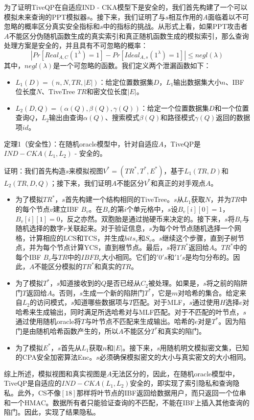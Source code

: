 \documentclass{cumcmthesis}
\numberwithin{equation}{section} %
\numberwithin{figure}{section} %
\numberwithin{table}{section} %
\begin{document}
为了证明TiveQP在自适应IND - CKA模型下是安全的，我们首先构建了一个可以模拟未来查询的PPT模拟器\(s\)。接下来，我们证明了与\(s\)相互作用的\(A\)面临着以不可忽略的概率区分真实安全指标和\(s\)中的指标的挑战。从形式上看，如果PPT攻击者\(A\)不能区分伪随机函数生成的真实索引和真正随机函数生成的模拟索引，那么查询处理方案是安全的，并且具有不可忽略的概率：
\[|Pr[Real_{A, C}(1^{\lambda}) = 1] - Pr[Ideal_{A, s}(1^{\lambda}) = 1]| \leq negl(\lambda)\]
其中，\(negl(\lambda)\)是一个可忽略的函数。我们定义两个泄漏函数如下：
\begin{itemize}
    \item \(L_{1}(D) = (n, N, TR,|E|)\)：给定位置数据集\(D\)，\(L_{1}\)输出数据集大小\(n\)、IBF位长度\(N\)、TiveTree \(TR\)和密文位长度\(|E|\)。
    \item \(L_{2}(D, Q) = (\alpha(Q), \beta(Q), \gamma(Q))\)：给定一个位置数据集\(D\)和一个位置查询\(Q\)，\(L_{2}\)输出由查询\(\alpha(Q)\)、搜索模式\(\beta(Q)\)和路径模式\(\gamma(Q)\)返回的数据项\(id\)。
\end{itemize}

定理1（安全性）：在随机oracle模型中，针对自适应\(A\)，TiveQP是\(IND - CKA(L_{1}, L_{2})\) - 安全的。

证明：我们首先构造\(s\)来模拟视图\(V^{*} = (TR^{*}, T^{*}, E^{*})\)，基于\(L_{1}(TR, D)\)和\(L_{2}(TR, D, Q)\)；接下来，我们证明\(A\)不能区分\(V^{*}\)和真正的对手观点\(A\)。
\begin{itemize}
    \item 为了模拟\(TR^{*}\)，\(s\)首先构建一个结构相同的TiveTree。\(s\)从\(L_{1}\)获取\(N\)，并为\(TR\)中的每个节点\(v\)建立IBF \(B_{v}\)。在\(B_{v}\)的第\(i\)个单元格中，\(s\)设\(B_{v}[i][0] = 1\)，\(B_{v}[i][1] = 0\)，反之亦然。双胞胎是通过抛硬币来决定的。接下来，\(s\)将\(B_{v}\)与随机选择的数字\(r\)关联起来。对于验证信息，\(s\)为每个叶节点随机选择一个网格，计算相应的LCS和TCS，并生成\(bits_{v}\)和\(S_{v}\)。\(s\)继续这个步骤，直到子树节点，并为每个节点计算YCS，直到根节点。最后，\(s\)将\(TR^{*}\)返回给\(A\)。\(TR^{*}\)中的每个IBF \(B_{v}\)与\(TR\)中的\(IBF B_{v}\)大小相同。它们的\('0's\)和\('1's\)是均匀分布的。因此，\(A\)不能区分模拟的\(TR^{*}\)和真实的\(TR\)。
    \item 为了模拟\(T^{*}\)，\(s\)知道接收到的\(Q\)是否已经从\(C_{2}\)被处理。如果是，\(s\)将之前的陷阱门\(T\)返回给\(A\)。否则，\(s\)生成一个新的陷阱门\(T^{*}\)，它是\(m\)对哈希的集合。给定来自\(L_{2}\)的访问模式，\(s\)知道哪些数据项与\(T\)匹配。对于MLF，\(s\)通过使用\(H\)选择\(e\)对哈希来生成输出，同时满足所选哈希对与MLF匹配。对于不匹配的叶节点，\(s\)通过使用随机oracle将\(T\)与叶节点不匹配来生成输出。哈希的\(e\)对是\(T^{*}\)。因为陷门是由随机哈希函数产生的，所以\(A\)不能区分\(T^{*}\)和真实的陷门。
    \item 为了模拟\(E^{*}\)，\(s\)首先从\(L_{1}\)获取\(n\)和\(|E|\)。接下来，\(s\)用随机明文模拟密文集，已知的CPA安全加密算法Enc。\(s\)必须确保模拟密文的大小与真实密文的大小相同。
\end{itemize}
综上所述，模拟视图和真实视图是\(A\)无法区分的，因此，在随机oracle模型中，TiveQP是自适应的\(IND - CKA(L_{1}, L_{2})\)安全的，即实现了索引隐私和查询隐私。此外，CS不像\([18]\)那样将叶节点的IBF返回给数据用户，而只返回一个位串和一个HMAC。数据所有者只能验证查询的不匹配，不能在IBF上插入其他查询的陷门。因此，实现了结果隐私。
\end{document}
